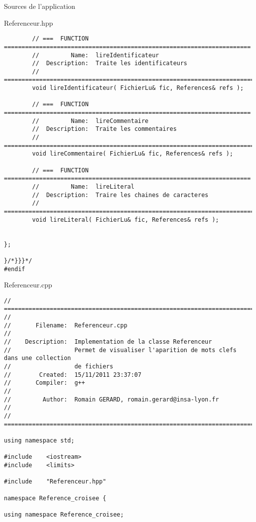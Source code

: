 \documentclass{article}
\begin{document}
\begin{section}{Sources de l'application}
\begin{paragraph}{Referenceur.hpp}
\begin{verbatim}
        // ===  FUNCTION  ======================================================================
        //         Name:  lireIdentificateur
        //  Description:  Traite les identificateurs
        // =====================================================================================
        void lireIdentificateur( FichierLu& fic, References& refs );

        // ===  FUNCTION  ======================================================================
        //         Name:  lireCommentaire
        //  Description:  Traite les commentaires
        // =====================================================================================
        void lireCommentaire( FichierLu& fic, References& refs );

        // ===  FUNCTION  ======================================================================
        //         Name:  lireLiteral
        //  Description:  Traire les chaines de caracteres
        // =====================================================================================
        void lireLiteral( FichierLu& fic, References& refs );


};

}/*}}}*/
#endif

  \end{verbatim}
  \end{paragraph}



\newpage
  \begin{paragraph}{Referenceur.cpp}
   \begin{verbatim}
// =====================================================================================
//
//       Filename:  Referenceur.cpp
//
//    Description:  Implementation de la classe Referenceur
//                  Permet de visualiser l'aparition de mots clefs dans une collection
//                  de fichiers
//        Created:  15/11/2011 23:37:07
//       Compiler:  g++
//
//         Author:  Romain GERARD, romain.gerard@insa-lyon.fr
//
// =====================================================================================

using namespace std;

#include    <iostream>
#include    <limits>

#include    "Referenceur.hpp"

namespace Reference_croisee {

using namespace Reference_croisee;




\end{verbatim}
\end{paragraph}
\end{section}
\end{document}
